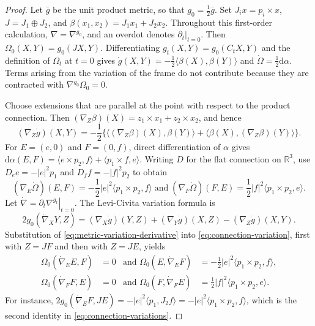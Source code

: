 \documentclass[10pt,a4paper]{amsart}
\newcommand{\R}{\mathbb R}
\newcommand{\dd}{\mathrm d}
\begin{document}
\begin{proof}
Let $\bar g$ be the unit product metric, so that
$g_0=\frac12\bar g$.  Set $J_i x=p_i\times x$,
$J=J_1\oplus J_2$, and $\beta(x_1,x_2)=J_1x_1+J_2x_2$.
Throughout this first-order calculation, $\nabla=\nabla^{g_0}$, and an
overdot denotes $\left.\partial_t\right|_{t=0}$.
Then $\Omega_0(X,Y)=g_0(JX,Y)$.  Differentiating
$g_t(X,Y)=g_0(C_tX,Y)$ and the definition of $\Omega_t$ at $t=0$ gives
$\dot g(X,Y)=-\tfrac12\langle\beta(X),\beta(Y)\rangle$ and
$\dot\Omega=\tfrac12\dd\alpha$.
Terms arising from the variation of the frame do not contribute because they
are contracted with $\nabla^{g_0}\Omega_0=0$.

Choose extensions that are parallel at the point with respect to the product
connection.  Then
$(\nabla_Z\beta)(X)=z_1\times x_1+z_2\times x_2$, and hence
\begin{equation}\label{eq:metric-variation-derivative}
 (\nabla_Z\dot g)(X,Y)=-\frac12\{\langle(\nabla_Z\beta)(X),\beta(Y)\rangle+\langle\beta(X),(\nabla_Z\beta)(Y)\rangle\}.
\end{equation}
For $E=(e,0)$ and $F=(0,f)$, direct differentiation of $\alpha$ gives
$\dd\alpha(E,F)
=\langle e\times p_2,f\rangle+\langle p_1\times f,e\rangle$.
Writing $D$ for the flat connection on $\R^3$, use
$D_e e=-|e|^2p_1$ and $D_f f=-|f|^2p_2$ to obtain
\begin{equation}                                                                    \label{eq:omega-variations}
 (\nabla_E\dot\Omega)(E,F)=-\frac12|e|^2\langle p_1\times p_2,f\rangle
 \;\text{and}\; (\nabla_F\dot\Omega)(F,E)=\frac12|f|^2\langle p_1\times p_2,e\rangle.
\end{equation}
Let $\dot{\nabla}=\left.\partial_t\nabla^{g_t}\right|_{t=0}$.  The
Levi-Civita variation
formula is
\begin{equation}                                                                    \label{eq:connection-variation}
 2g_0(\dot{\nabla}_X Y,Z)
 =(\nabla_X\dot g)(Y,Z)+(\nabla_Y\dot g)(X,Z)
 -(\nabla_Z\dot g)(X,Y).
\end{equation}
Substitution of \eqref{eq:metric-variation-derivative} into
\eqref{eq:connection-variation}, first with $Z=JF$ and then with
$Z=JE$, yields
\begin{equation}                                                                    \label{eq:connection-variations}
 \begin{aligned}
 \Omega_0(\dot{\nabla}_E E,F)&=0
 &\text{and } \Omega_0(E,\dot{\nabla}_E F)&=-\frac12|e|^2\langle p_1\times p_2,f\rangle,\\
 \Omega_0(\dot{\nabla}_F F,E)&=0
 &\text{and } \Omega_0(F,\dot{\nabla}_F E)&=\frac12|f|^2\langle p_1\times p_2,e\rangle.
 \end{aligned}
\end{equation}
For instance,
$2g_0(\dot{\nabla}_E F,J E)=-|e|^2\langle p_1,J_2f\rangle
=-|e|^2\langle p_1\times p_2,f\rangle$, which is the second identity in
\eqref{eq:connection-variations}.


\end{proof}
\end{document}
